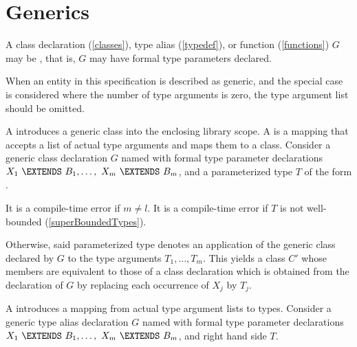 \documentclass[makeidx]{article}
\begin{document}
\section{Generics}

\LMHash{}%
A class declaration (\ref{classes}), type alias (\ref{typedef}), or function (\ref{functions}) $G$ may be , that is, $G$ may have formal type parameters declared.

\LMHash{}%
When an entity in this specification is described as generic,
and the special case is considered where the number of type arguments is zero,
the type argument list should be omitted.


\LMHash{}%
A 
introduces a generic class into the enclosing library scope.
A 
is a mapping that accepts a list of actual type arguments and maps them to a class.
Consider a generic class declaration $G$ named  with formal type parameter declarations
$X_1\ \EXTENDS\ B_1, \ldots,\ X_m\ \EXTENDS\ B_m$,
and a parameterized type $T$ of the form .

\LMHash{}%
It is a compile-time error if $m \not= l$.
It is a compile-time error if $T$ is not well-bounded
(\ref{superBoundedTypes}).

\LMHash{}%
Otherwise, said parameterized type  denotes an application of the generic class declared by $G$ to the type arguments $T_1, \ldots, T_m$.
This yields a class $C'$ whose members are equivalent to those of a class declaration which is obtained from the declaration of $G$ by replacing each occurrence of $X_j$ by $T_j$.

\LMHash{}%
A 
introduces a mapping from actual type argument lists to types.
Consider a generic type alias declaration $G$ named 
with formal type parameter declarations
$X_1\ \EXTENDS\ B_1, \ldots,\ X_m\ \EXTENDS\ B_m$,
and right hand side $T$.
\end{document}
